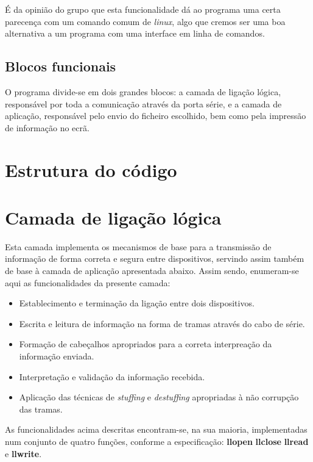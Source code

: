 \documentclass{article}
\begin{document}
É da opinião do grupo que esta funcionalidade dá ao programa uma certa parecença com um comando comum de \textit{linux}, algo que cremos ser uma boa alternativa a um programa com uma interface em linha de comandos.

\subsection{Blocos funcionais}
O programa divide-se em dois grandes blocos: a camada de ligação lógica, responsável por toda a comunicação através da porta série, e a camada de aplicação, responsável pelo envio do ficheiro escolhido, bem como pela impressão de informação no ecrã.

\section{Estrutura do código}



\section{Camada de ligação lógica}
Esta camada implementa os mecanismos de base para a transmissão de informação de forma correta e segura entre dispositivos, servindo assim também de base à camada de aplicação apresentada abaixo. %
Assim sendo, enumeram-se aqui as funcionalidades da presente camada:

\begin{itemize}
    \item Establecimento e terminação da ligação entre dois dispositivos.
    \item Escrita e leitura de informação na forma de tramas através do cabo de série.
    \item Formação de cabeçalhos apropriados para a correta interpreação da informação enviada.
    \item Interpretação e validação da informação recebida.
    \item Aplicação das técnicas de \textit{stuffing} e \textit{destuffing} apropriadas à não corrupção das tramas.
\end{itemize}
As funcionalidades acima descritas encontram-se, na sua maioria, implementadas num conjunto de quatro funções, conforme a especificação: \textbf{llopen} \textbf{llclose} \textbf{llread} e \textbf{llwrite}.\\
\end{document}
